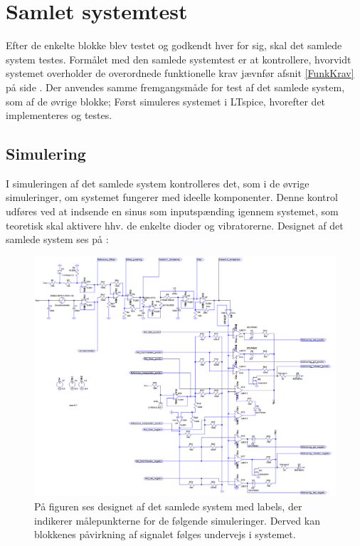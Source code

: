 \section{Samlet systemtest}
Efter de enkelte blokke blev testet og godkendt hver for sig, skal det samlede system testes. Formålet med den samlede systemtest er at kontrollere, hvorvidt systemet overholder de overordnede funktionelle krav jævnfør afsnit \ref{FunkKrav} på side \pageref{FunkKrav}. Der anvendes samme fremgangsmåde for test af det samlede system, som af de øvrige blokke; Først simuleres systemet i LTspice, hvorefter det implementeres og testes.

\subsection{Simulering}
I simuleringen af det samlede system kontrolleres det, som i de øvrige simuleringer, om systemet fungerer med ideelle komponenter. Denne kontrol udføres ved at indsende en sinus som inputspænding igennem systemet, som teoretisk skal aktivere hhv. de enkelte dioder og vibratorerne. Designet af det samlede system ses på :
\begin{figure}[H]
	\centering
	\includegraphics[scale=.38]{figures/cProblemloesning/Samlet_system2.PNG}
	\caption{På figuren ses designet af det samlede system med labels, der indikerer målepunkterne for de følgende simuleringer. Derved kan blokkenes påvirkning af signalet følges undervejs i systemet.}
	\label{fig:samlet_system}
\end{figure}
